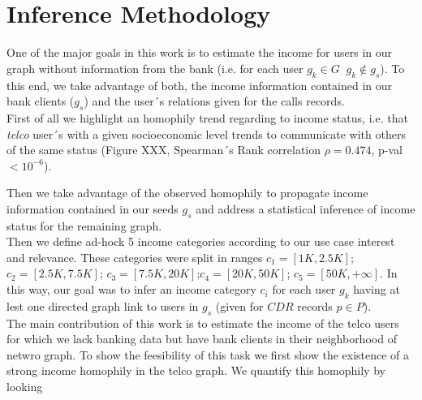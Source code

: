 \section{Inference Methodology}






One of the major goals in this work is to estimate the income for users in our graph without information from the bank (i.e. for each user $g_k \in G $ $\ g_k \notin g_s$). To this end, we take advantage of both, the income information contained in our bank clients ($g_s$) and the user´s relations given for the calls records. \\

First of all we highlight an homophily trend regarding to income status, i.e. that \textit{telco} user´s with a given socioeconomic level trends to communicate with others of the same status (Figure XXX, Spearman´s Rank correlation $\rho= 0.474$, p-val$<10^{-6}$). 

Then we take advantage of the observed homophily to propagate income information contained in our seeds $g_s$ and address a statistical inference of income status for the remaining graph. \\

Then we define ad-hock 5 income categories according to our use case interest and relevance. These categories were split in ranges $c_1=[1K,2.5K]$; $c_2=[2.5K,7.5K]$; $c_3=[7.5K,20K]$;$c_4=[20K,50K]$; $c_5=[50K,+ \infty]$.  In this way, our goal was to infer an income category $c_i$ for each user $g_k$ having at lest one directed graph link to users in $g_s$ (given for $CDR$ records  $p\in P$).\\

The main contribution of this work is to estimate the income of the telco users for which we lack banking data but have bank clients in their neighborhood of netwro graph. To show the feesibility of this task we first show the existence of a strong income homophily in the telco graph. We quantify this homophily by looking 


